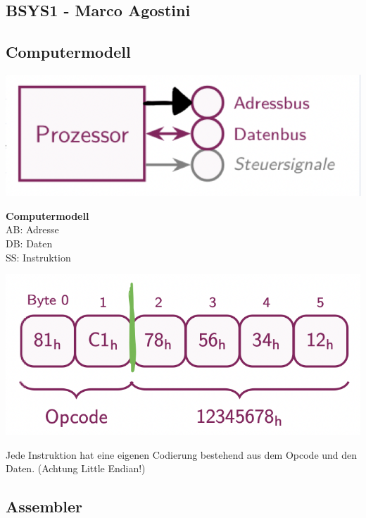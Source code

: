 \documentclass[7pt,landscape,a4paper]{scrartcl}
\begin{document}
\begin{multicols*}{4}

\section{BSYS1 - Marco Agostini}
\vspace{-1.0em}
\subsection{Computermodell}
\vspace{-1.0em}
\includegraphics[width=0.5\linewidth]{computermodell}
\begin{minipage}[b]{0,5\linewidth}
\textbf{Computermodell}\\
AB: Adresse\\
DB: Daten\\
SS: Instruktion
\end{minipage}
\includegraphics[width=0.45\linewidth]{Instruktioncodierung}
\begin{minipage}[b]{0,5\linewidth}
Jede Instruktion hat eine eigenen Codierung bestehend aus dem Opcode und den Daten. (Achtung Little Endian!)
\end{minipage}
\subsection{Assembler}
\vspace{-0.75em}


\end{multicols*}
\end{document}
